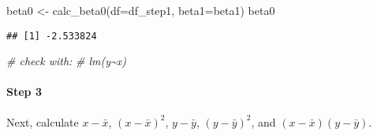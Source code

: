 \documentclass[
]{article}
\newenvironment{Shaded}{\begin{snugshade}}{\end{snugshade}}
\newcommand{\AttributeTok}[1]{\textcolor[rgb]{0.77,0.63,0.00}{#1}}
\newcommand{\CommentTok}[1]{\textcolor[rgb]{0.56,0.35,0.01}{\textit{#1}}}
\newcommand{\FunctionTok}[1]{\textcolor[rgb]{0.00,0.00,0.00}{#1}}
\newcommand{\NormalTok}[1]{#1}
\newcommand{\OtherTok}[1]{\textcolor[rgb]{0.56,0.35,0.01}{#1}}
\begin{document}
\begin{Shaded}
\begin{Highlighting}[]
\NormalTok{beta0 }\OtherTok{\textless{}{-}} \FunctionTok{calc\_beta0}\NormalTok{(}\AttributeTok{df=}\NormalTok{df\_step1, }\AttributeTok{beta1=}\NormalTok{beta1)}
\NormalTok{beta0}
\end{Highlighting}
\end{Shaded}

\begin{verbatim}
## [1] -2.533824
\end{verbatim}

\begin{Shaded}
\begin{Highlighting}[]
\CommentTok{\# check with:}
\CommentTok{\# lm(y\textasciitilde{}x)}
\end{Highlighting}
\end{Shaded}

\hypertarget{step-3}{%
\paragraph{Step 3}\label{step-3}}

Next, calculate \(x-\bar x\), \((x- \bar x)^2\), \(y-\bar y\),
\((y-\bar y)^2\), and \((x-\bar x)(y-\bar y)\).
\end{document}
